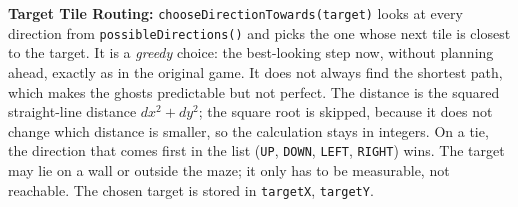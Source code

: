 \documentclass[11pt, a4paper]{article}
\begin{document}
\textbf{Target Tile Routing:} \texttt{chooseDirectionTowards(target)} looks at every direction from \texttt{possibleDirections()} and picks the one whose next tile is closest to the target. It is a \textit{greedy} choice: the best-looking step now, without planning ahead, exactly as in the original game. It does not always find the shortest path, which makes the ghosts predictable but not perfect. The distance is the squared straight-line distance $dx^2 + dy^2$; the square root is skipped, because it does not change which distance is smaller, so the calculation stays in integers. On a tie, the direction that comes first in the list (\texttt{UP}, \texttt{DOWN}, \texttt{LEFT}, \texttt{RIGHT}) wins. The target may lie on a wall or outside the maze; it only has to be measurable, not reachable. The chosen target is stored in \texttt{targetX}, \texttt{targetY}.
\end{document}
